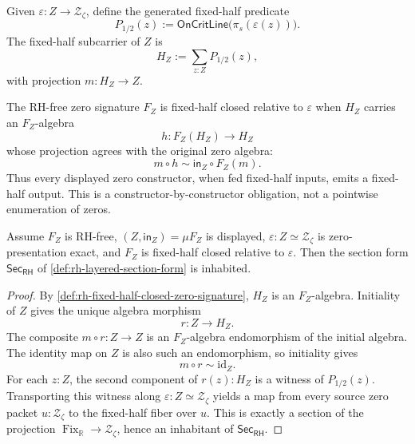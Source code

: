\begin{definition}
\label{def:rh-generated-fixed-half-subcarrier}
Given $\varepsilon:Z\to\mathcal Z_{\zeta}$, define the generated
fixed-half predicate
$$
P_{1/2}(z)
:=
\mathsf{OnCritLine}\bigl(\pi_s(\varepsilon(z))\bigr).
$$
The fixed-half subcarrier of $Z$ is
$$
H_Z
:=
\sum_{z:Z}P_{1/2}(z),
$$
with projection $m:H_Z\to Z$.
\end{definition}

\begin{definition}
\label{def:rh-fixed-half-closed-zero-signature}
The RH-free zero signature $F_Z$ is fixed-half closed relative to
$\varepsilon$ when $H_Z$ carries an $F_Z$-algebra
$$
h:F_Z(H_Z)\to H_Z
$$
whose projection agrees with the original zero algebra:
$$
m\circ h
\sim
\mathsf{in}_{Z}\circ F_Z(m).
$$
Thus every displayed zero constructor, when fed fixed-half inputs, emits a
fixed-half output. This is a constructor-by-constructor obligation, not a
pointwise enumeration of zeros.
\end{definition}

\begin{theorem}
\label{thm:rh-conditional-initiality-route-section}
Assume $F_Z$ is RH-free, $(Z,\mathsf{in}_{Z})=\mu F_Z$ is displayed,
$\varepsilon:Z\simeq\mathcal Z_{\zeta}$ is zero-presentation exact, and
$F_Z$ is fixed-half closed relative to $\varepsilon$. Then the section form
$\mathsf{Sec}_{\mathsf{RH}}$ of \autoref{def:rh-layered-section-form} is
inhabited.
\end{theorem}

\begin{proof}
By \autoref{def:rh-fixed-half-closed-zero-signature}, $H_Z$ is an
$F_Z$-algebra. Initiality of $Z$ gives the unique algebra morphism
$$
r:Z\to H_Z.
$$
The composite $m\circ r:Z\to Z$ is an $F_Z$-algebra endomorphism of the
initial algebra. The identity map on $Z$ is also such an endomorphism, so
initiality gives
$$
m\circ r\sim\mathrm{id}_{Z}.
$$
For each $z:Z$, the second component of $r(z):H_Z$ is a witness of
$P_{1/2}(z)$. Transporting this witness along
$\varepsilon:Z\simeq\mathcal Z_{\zeta}$ yields a map from every source
zero packet $u:\mathcal Z_{\zeta}$ to the fixed-half fiber over $u$. This
is exactly a section of the projection
$\operatorname{Fix}_{\mathbb R}\to\mathcal Z_{\zeta}$, hence an inhabitant
of $\mathsf{Sec}_{\mathsf{RH}}$.
\end{proof}

